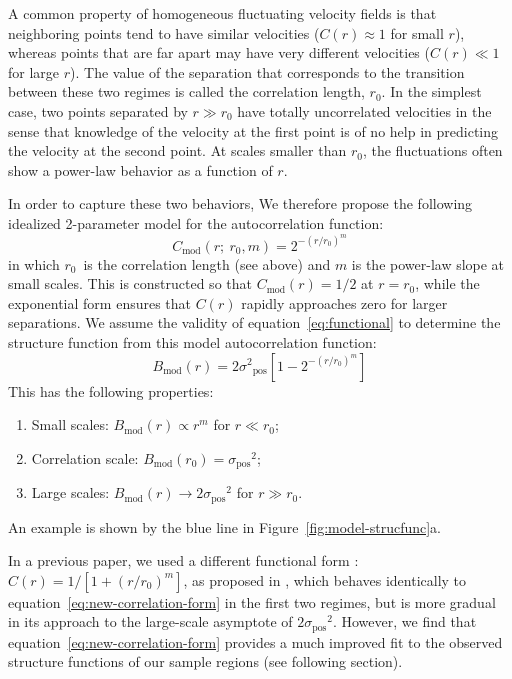 \documentclass[fleqn,usenatbib, useAMS, a4paper]{mnras}
\newcommand\pos{\ensuremath{_{\mathrm{pos}}}}
\newcommand\model{\ensuremath{_{\mathrm{mod}}}}
\begin{document}
A common property of homogeneous fluctuating velocity fields is that neighboring points tend to have similar velocities
(\(C(r) \approx 1\) for small \(r\)),
whereas points that are far apart may have very different velocities
(\(C(r) \ll 1\) for large \(r\)).
The value of the separation that corresponds to
the transition between these two regimes
is called the correlation length, \(r_0\).
In the simplest case,
two points separated by \(r \gg r_0\) have totally uncorrelated velocities
in the sense that knowledge of the velocity at the first point is of
no help in predicting the velocity at the second point.
At scales smaller than \(r_0\), the fluctuations often show a power-law behavior
as a function of \(r\).

In order to capture these two behaviors,
We therefore propose the following idealized 2-parameter model
for the autocorrelation function:
%
\begin{equation}\label{eq:new-correlation-form}
  C\model(r;\ r_0, m) = 2^{- \left( r/r_0 \right)^m} 
\end{equation}
%
in which \(r_{0}\)\ is the correlation length (see above)
and \(m\) is the power-law slope at small scales.
This is constructed so that \(C\model(r) = 1/2\) at \(r = r_0\),
while the exponential form ensures that \(C(r)\) rapidly approaches zero
for larger separations.
We assume the validity of equation~\eqref{eq:functional} to determine the structure function
from this model autocorrelation function:
\begin{equation}
  \label{eq:model-strucfunc-ideal}
  B\model(r) = 2\sigma^2\pos \left[
    1 - 2^{- \left( r/r_0 \right)^m} 
  \right]
\end{equation}
This has the following properties:
\begin{enumerate}[1.]
 \item Small scales: \(B\model(r) \propto r^m\) for \(r \ll r_0\);
 \item Correlation scale: \(B\model(r_0) = \sigma\pos^2\);
 \item Large scales: \(B\model(r) \to 2 \sigma\pos^2\) for \(r \gg r_0\).
 \end{enumerate}
An example is shown by the blue line in Figure~\ref{fig:model-strucfunc}a.
 
In a previous paper, we used a different functional form
\citetext{See Fig.~13 of \citealp{arthur2016turbulence}}:
\(C(r) = 1/[1+(r/r_{0})^{m}]\), as proposed in \citet{1984ApJ...277..556S},
which behaves identically to equation~\eqref{eq:new-correlation-form}
in the first two regimes, but is more gradual in its approach
to the large-scale asymptote of \(2 \sigma\pos^2\).
However, we find that equation~\eqref{eq:new-correlation-form}
provides a much improved fit to the observed structure functions
of our sample regions (see following section). 
\end{document}
